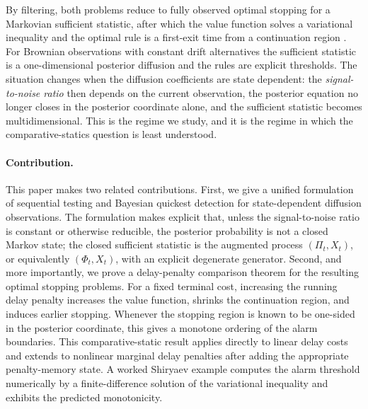 \documentclass[pdflatex,sn-mathphys-num]{sn-jnl}
\theoremstyle{plain}
\theoremstyle{definition}
\newcommand{\post}{\Pi}
\newcommand{\odds}{\Phi}
\begin{document}
By filtering, both problems reduce to fully observed optimal stopping for a
Markovian sufficient statistic, after which the value function solves a
variational inequality and the optimal rule is a first-exit time from a
continuation region \citep{liptser1977statistics,peskir2006optimal,yu2026pattern,peskir2000sequential,epstein2022optimal,ekstrom2022multi,ankirchner2020bayesian,wang2026breakdown,shiryaev2025optimal}.
For Brownian observations with constant drift alternatives the sufficient
statistic is a one-dimensional posterior diffusion and the rules are explicit
thresholds. The situation changes when the diffusion coefficients are state
dependent: the \emph{signal-to-noise ratio} then depends on the current
observation, the posterior equation no longer closes in the posterior coordinate
alone, and the sufficient statistic becomes multidimensional. This is the regime
we study, and it is the regime in which the comparative-statics question is least
understood.

\paragraph{Contribution.}
This paper makes two related contributions. First, we give a unified formulation
of sequential testing and Bayesian quickest detection for state-dependent
diffusion observations. The formulation makes explicit that, unless the
signal-to-noise ratio is constant or otherwise reducible, the posterior
probability is not a closed Markov state; the closed sufficient statistic is the
augmented process $(\post_t,X_t)$, or equivalently $(\odds_t,X_t)$, with an
explicit degenerate generator. Second, and more importantly, we prove a
delay-penalty comparison theorem for the resulting optimal stopping problems.
For a fixed terminal cost, increasing the running delay penalty increases the
value function, shrinks the continuation region, and induces earlier stopping.
Whenever the stopping region is known to be one-sided in the posterior
coordinate, this gives a monotone ordering of the alarm boundaries. This
comparative-static result applies directly to linear delay costs and extends to
nonlinear marginal delay penalties after adding the appropriate penalty-memory
state. A worked Shiryaev example computes the alarm threshold numerically by a
finite-difference solution of the variational inequality and exhibits the
predicted monotonicity.
\end{document}
